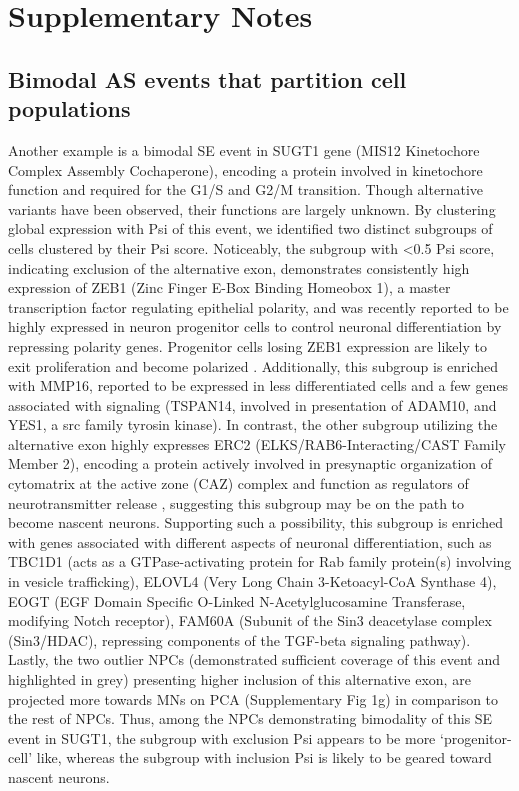 \section{Supplementary Notes}

\subsection{Bimodal AS events that partition cell populations}

Another example is a bimodal SE event in SUGT1 gene (MIS12 Kinetochore Complex Assembly Cochaperone), encoding a protein involved in kinetochore function and required for the G1/S and G2/M transition. Though alternative variants have been observed, their functions are largely unknown. By clustering global expression with Psi of this event, we identified two distinct subgroups of cells clustered by their Psi score. Noticeably, the subgroup with <0.5 Psi score, indicating exclusion of the alternative exon, demonstrates consistently high expression of ZEB1 (Zinc Finger E-Box Binding Homeobox 1), a master transcription factor regulating epithelial polarity, and was recently reported to be highly expressed in neuron progenitor cells to control neuronal differentiation by repressing polarity genes. Progenitor cells losing ZEB1 expression are likely to exit proliferation and become polarized \cite{Singh:2016iz}. Additionally, this subgroup is enriched with MMP16, reported to be expressed in less differentiated cells \cite{Astarci:2012bk} and a few genes associated with signaling (TSPAN14, involved in presentation of ADAM10, and YES1, a src family tyrosin kinase). In contrast, the other subgroup utilizing the alternative exon highly expresses ERC2 (ELKS/RAB6-Interacting/CAST Family Member 2), encoding a protein actively involved in presynaptic organization of cytomatrix at the active zone (CAZ) complex and function as regulators of neurotransmitter release \cite{Ko:2006gx}, suggesting this subgroup may be on the path to become nascent neurons. Supporting such a possibility, this subgroup is enriched with genes associated with different aspects of neuronal differentiation, such as TBC1D1 (acts as a GTPase-activating protein for Rab family protein(s) involving in vesicle trafficking), ELOVL4 (Very Long Chain 3-Ketoacyl-CoA Synthase 4), EOGT (EGF Domain Specific O-Linked N-Acetylglucosamine Transferase, modifying Notch receptor), FAM60A (Subunit of the Sin3 deacetylase complex (Sin3/HDAC), repressing components of the TGF-beta signaling pathway). Lastly, the two outlier NPCs (demonstrated sufficient coverage of this event and highlighted in grey) presenting higher inclusion of this alternative exon, are projected more towards MNs on PCA (Supplementary Fig 1g) in comparison to the rest of NPCs. Thus, among the NPCs demonstrating bimodality of this SE event in SUGT1, the subgroup with exclusion Psi appears to be more `progenitor-cell' like, whereas the subgroup with inclusion Psi is likely to be geared toward nascent neurons.











